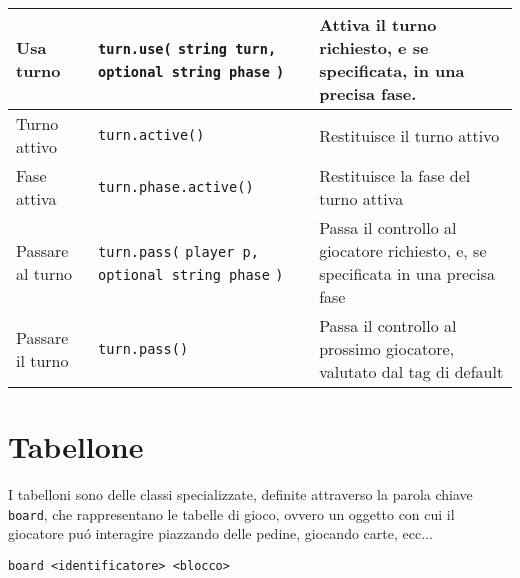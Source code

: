 \begin{center}
\begin{tabularx}{\linewidth}{|l|p{6cm}|X|}
    \hline
    Usa turno & 
    \lstinline|turn.use(|\newline 
    \lstinline|string turn, |\newline
    \lstinline|optional string phase|\newline
    \lstinline|)| & Attiva il turno richiesto, e se specificata, in una precisa fase.\\
    \hline 
    Turno attivo & \lstinline|turn.active()| & Restituisce il turno attivo \\
    \hline
    Fase attiva & \lstinline|turn.phase.active()| & Restituisce la fase del turno attiva \\
    \hline
    Passare al turno &
    \lstinline|turn.pass(|\newline
    \lstinline|player p, |\newline
    \lstinline|optional string phase|\newline
    \lstinline|)|
    &
    Passa il controllo al giocatore richiesto,
    e, se specificata in una precisa fase \\
    \hline
    Passare il turno & \lstinline|turn.pass()| & Passa il controllo al prossimo giocatore, 
    valutato dal tag di default \\
    \hline 
\end{tabularx}
\end{center}

\section{Tabellone}
I tabelloni sono delle classi specializzate, definite attraverso la parola chiave \lstinline|board|,
che rappresentano le tabelle di gioco, ovvero un oggetto con cui
il giocatore puó interagire piazzando delle pedine, giocando carte, ecc... \\ 
\begin{lstlisting}
board <identificatore> <blocco>
\end{lstlisting}

